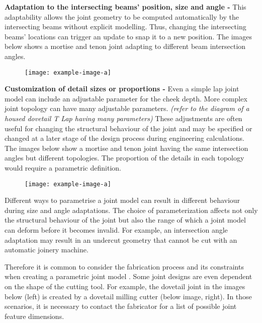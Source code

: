 \textbf{Adaptation to the intersecting beams' position, size and angle -} This adaptability allows the joint geometry to be computed automatically by the intersecting beams without explicit modelling. Thus, changing the intersecting beams’ locations can trigger an update to snap it to a new position. The images below shows a mortise and tenon joint adapting to different beam intersection angles.

\begin{figure}[H]
    \centering
    \texttt{[image: example-image-a]}
\end{figure}

\textbf{Customization of detail sizes or proportions - }Even a simple lap joint model can include an adjustable parameter for the cheek depth. More complex joint topology can have many adjustable parameters. \textit{(refer to the diagram of a housed dovetail T Lap having many parameters) }These adjustments are often useful for changing the structural behaviour of the joint and may be specified or changed at a later stage of the design process during engineering calculations. The images below show a mortise and tenon joint having the same intersection angles but different topologies. The proportion of the details in each topology would require a parametric definition.

\begin{figure}[H]
    \centering
    \texttt{[image: example-image-a]}
\end{figure}

Different ways to parametrise a joint model can result in different behaviour during size and angle adaptations. The choice of parameterization affects not only the structural behaviour of the joint but also the range of which a joint model can deform before it becomes invalid. For example, an intersection angle adaptation may result in an undercut geometry that cannot be cut with an automatic joinery machine.

Therefore it is common to consider the fabrication process and its constraints when creating a parametric joint model \parencite{vestartasDesigntoFabricationWorkflowRawSawnTimber2021}. Some joint designs are even dependent on the shape of the cutting tool. For example, the dovetail joint in the images below (left) is created by a dovetail milling cutter (below image, right). In those scenarios, it is necessary to contact the fabricator for a list of possible joint feature dimensions. 

